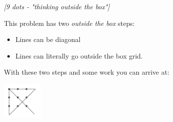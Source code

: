 %
\filbreak
\begin{problem}
\textit{[9 dots - "thinking outside the box"]}

This problem has two \textit{outside the box} steps:
\begin{itemize}
\item Lines can be diagonal
\item Lines can literally go outside the box grid.
\end{itemize}

With these two steps and some work you can arrive at:
\begin{center}
\includegraphics[width=2cm]{3by3Solved.png}
\end{center}
\end{problem}
%


